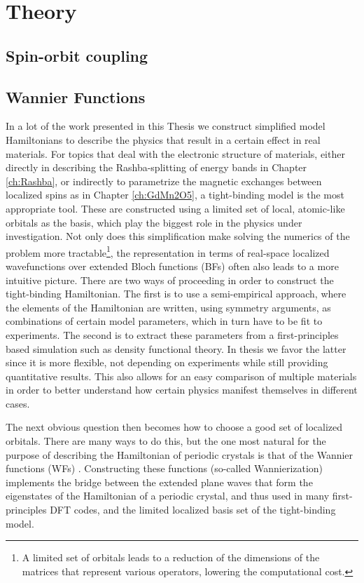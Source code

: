 \chapter{Theory}
\section{Spin-orbit coupling}
\section{Wannier Functions}

In a lot of the work presented in this Thesis we construct simplified model Hamiltonians to describe the physics that result in a certain effect in real materials.
For topics that deal with the electronic structure of materials, either directly in describing the Rashba-splitting of energy bands in Chapter \ref{ch:Rashba}, or indirectly to parametrize the magnetic exchanges between localized spins as in Chapter \ref{ch:GdMn2O5}, a tight-binding model is the most appropriate tool.
These are constructed using a limited set of local, atomic-like orbitals as the basis, which play the biggest role in the physics under investigation.
Not only does this simplification make solving the numerics of the problem more tractable\footnote{A limited set of orbitals leads to a reduction of the dimensions of the matrices that represent various operators, lowering the computational cost.}, the representation in terms of real-space localized wavefunctions over extended Bloch functions (BFs) often also leads to a more intuitive picture.
There are two ways of proceeding in order to construct the tight-binding Hamiltonian.
The first is to use a semi-empirical approach, where the elements of the Hamiltonian are written, using symmetry arguments, as combinations of certain model parameters, which in turn have to be fit to experiments.
The second is to extract these parameters from a first-principles based simulation such as density functional theory.
In thesis we favor the latter since it is more flexible, not depending on experiments while still providing quantitative results.
This also allows for an easy comparison of multiple materials in order to better understand how certain physics manifest themselves in different cases. 

The next obvious question then becomes how to choose a good set of localized orbitals. There are many ways to do this, but the one most natural for the purpose of describing the Hamiltonian of periodic crystals is that of the Wannier functions (WFs) \cite{Wannier1937}.
Constructing these functions (so-called Wannierization) implements the bridge between the extended plane waves that form the eigenstates of the Hamiltonian of a periodic crystal, and thus used in many first-principles DFT codes, and the limited localized basis set of the tight-binding model.

